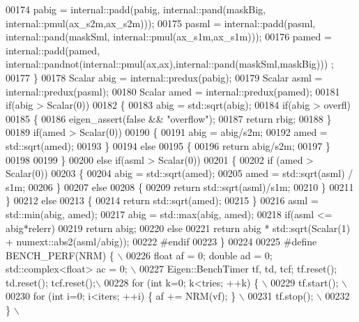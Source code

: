 \begin{DoxyCode}
00174     pabig = internal::padd(pabig, internal::pand(maskBig, internal::pmul(ax\_s2m,ax\_s2m)));
00175     pasml = internal::padd(pasml, internal::pand(maskSml, internal::pmul(ax\_s1m,ax\_s1m)));
00176     pamed = internal::padd(pamed, internal::pandnot(internal::pmul(ax,ax),internal::pand(maskSml,maskBig)))
      ;
00177   \}
00178   Scalar abig = internal::predux(pabig);
00179   Scalar asml = internal::predux(pasml);
00180   Scalar amed = internal::predux(pamed);
00181   \textcolor{keywordflow}{if}(abig > Scalar(0))
00182   \{
00183     abig = std::sqrt(abig);
00184     \textcolor{keywordflow}{if}(abig > overfl)
00185     \{
00186       eigen\_assert(\textcolor{keyword}{false} && \textcolor{stringliteral}{"overflow"});
00187       \textcolor{keywordflow}{return} rbig;
00188     \}
00189     \textcolor{keywordflow}{if}(amed > Scalar(0))
00190     \{
00191       abig = abig/s2m;
00192       amed = std::sqrt(amed);
00193     \}
00194     \textcolor{keywordflow}{else}
00195     \{
00196       \textcolor{keywordflow}{return} abig/s2m;
00197     \}
00198 
00199   \}
00200   \textcolor{keywordflow}{else} \textcolor{keywordflow}{if}(asml > Scalar(0))
00201   \{
00202     \textcolor{keywordflow}{if} (amed > Scalar(0))
00203     \{
00204       abig = std::sqrt(amed);
00205       amed = std::sqrt(asml) / s1m;
00206     \}
00207     \textcolor{keywordflow}{else}
00208     \{
00209       \textcolor{keywordflow}{return} std::sqrt(asml)/s1m;
00210     \}
00211   \}
00212   \textcolor{keywordflow}{else}
00213   \{
00214     \textcolor{keywordflow}{return} std::sqrt(amed);
00215   \}
00216   asml = std::min(abig, amed);
00217   abig = std::max(abig, amed);
00218   \textcolor{keywordflow}{if}(asml <= abig*relerr)
00219     \textcolor{keywordflow}{return} abig;
00220   \textcolor{keywordflow}{else}
00221     \textcolor{keywordflow}{return} abig * std::sqrt(Scalar(1) + numext::abs2(asml/abig));
00222 \textcolor{preprocessor}{  #endif}
00223 \}
00224 
00225 \textcolor{preprocessor}{#define BENCH\_PERF(NRM) \{ \(\backslash\)}
00226 \textcolor{preprocessor}{  float af = 0; double ad = 0; std::complex<float> ac = 0; \(\backslash\)}
00227 \textcolor{preprocessor}{  Eigen::BenchTimer tf, td, tcf; tf.reset(); td.reset(); tcf.reset();\(\backslash\)}
00228 \textcolor{preprocessor}{  for (int k=0; k<tries; ++k) \{ \(\backslash\)}
00229 \textcolor{preprocessor}{    tf.start(); \(\backslash\)}
00230 \textcolor{preprocessor}{    for (int i=0; i<iters; ++i) \{ af += NRM(vf); \} \(\backslash\)}
00231 \textcolor{preprocessor}{    tf.stop(); \(\backslash\)}
00232 \textcolor{preprocessor}{  \} \(\backslash\)}

\end{DoxyCode}
